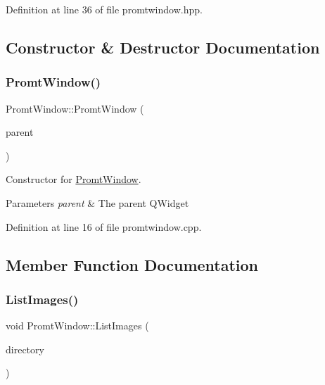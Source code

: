 Definition at line 36 of file promtwindow.\+hpp.



\subsection{Constructor \& Destructor Documentation}
\mbox{\label{classPromtWindow_a6536787a099e6d7348db00b4382244a8}} 
\subsubsection{\texorpdfstring{Promt\+Window()}{PromtWindow()}}
{\footnotesize\ttfamily Promt\+Window\+::\+Promt\+Window (\begin{DoxyParamCaption}\item[{Q\+Widget $\ast$}]{parent }\end{DoxyParamCaption})}



Constructor for \mbox{\hyperlink{classPromtWindow}{Promt\+Window}}. 


\begin{DoxyParams}{Parameters}
{\em parent} & The parent Q\+Widget \\
\hline
\end{DoxyParams}


Definition at line 16 of file promtwindow.\+cpp.



\subsection{Member Function Documentation}
\mbox{\label{classPromtWindow_a9f2e84ed19a4f520e0e764c31cc39362}} 
\subsubsection{\texorpdfstring{List\+Images()}{ListImages()}}
{\footnotesize\ttfamily void Promt\+Window\+::\+List\+Images (\begin{DoxyParamCaption}\item[{Q\+Dir}]{directory }\end{DoxyParamCaption})}



